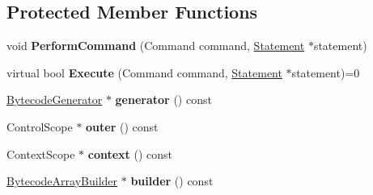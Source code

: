 \subsection*{Protected Member Functions}
\begin{DoxyCompactItemize}
\item 
void {\bfseries Perform\+Command} (Command command, \hyperlink{classv8_1_1internal_1_1_statement}{Statement} $\ast$statement)\hypertarget{classv8_1_1internal_1_1interpreter_1_1_b_a_s_e___e_m_b_e_d_d_e_d_a5aef272de54a3825a1f740aa6821b666}{}\label{classv8_1_1internal_1_1interpreter_1_1_b_a_s_e___e_m_b_e_d_d_e_d_a5aef272de54a3825a1f740aa6821b666}

\item 
virtual bool {\bfseries Execute} (Command command, \hyperlink{classv8_1_1internal_1_1_statement}{Statement} $\ast$statement)=0\hypertarget{classv8_1_1internal_1_1interpreter_1_1_b_a_s_e___e_m_b_e_d_d_e_d_abfbcf81ee0b9642e5335ee51091f6290}{}\label{classv8_1_1internal_1_1interpreter_1_1_b_a_s_e___e_m_b_e_d_d_e_d_abfbcf81ee0b9642e5335ee51091f6290}

\item 
\hyperlink{classv8_1_1internal_1_1interpreter_1_1_bytecode_generator}{Bytecode\+Generator} $\ast$ {\bfseries generator} () const \hypertarget{classv8_1_1internal_1_1interpreter_1_1_b_a_s_e___e_m_b_e_d_d_e_d_a6da2e22a0a50307d550b927060d5b4a9}{}\label{classv8_1_1internal_1_1interpreter_1_1_b_a_s_e___e_m_b_e_d_d_e_d_a6da2e22a0a50307d550b927060d5b4a9}

\item 
Control\+Scope $\ast$ {\bfseries outer} () const \hypertarget{classv8_1_1internal_1_1interpreter_1_1_b_a_s_e___e_m_b_e_d_d_e_d_a43b6c216f5558359d2bcd7e1e86fe9be}{}\label{classv8_1_1internal_1_1interpreter_1_1_b_a_s_e___e_m_b_e_d_d_e_d_a43b6c216f5558359d2bcd7e1e86fe9be}

\item 
Context\+Scope $\ast$ {\bfseries context} () const \hypertarget{classv8_1_1internal_1_1interpreter_1_1_b_a_s_e___e_m_b_e_d_d_e_d_a6d25ef25248cdf9d284c6fcee531ae4b}{}\label{classv8_1_1internal_1_1interpreter_1_1_b_a_s_e___e_m_b_e_d_d_e_d_a6d25ef25248cdf9d284c6fcee531ae4b}

\item 
\hyperlink{classv8_1_1internal_1_1interpreter_1_1_bytecode_array_builder}{Bytecode\+Array\+Builder} $\ast$ {\bfseries builder} () const \hypertarget{classv8_1_1internal_1_1interpreter_1_1_b_a_s_e___e_m_b_e_d_d_e_d_a0bcc79b2739102c69ab5aba44cbd3037}{}\label{classv8_1_1internal_1_1interpreter_1_1_b_a_s_e___e_m_b_e_d_d_e_d_a0bcc79b2739102c69ab5aba44cbd3037}

\end{DoxyCompactItemize}
